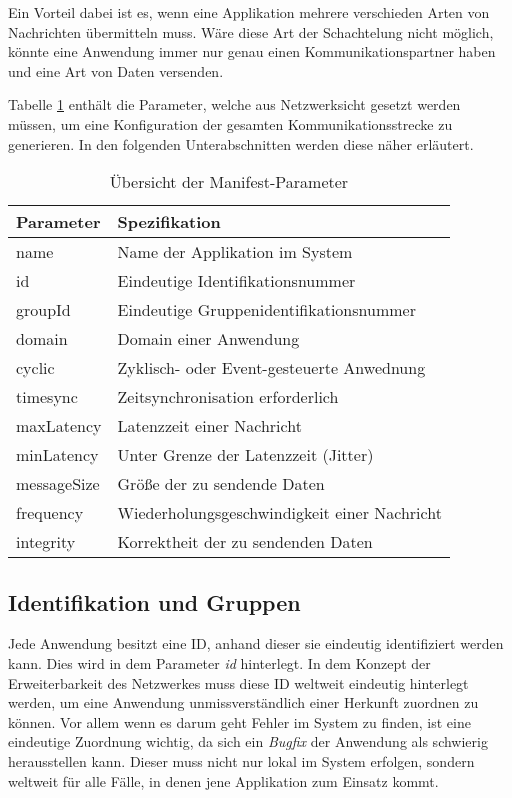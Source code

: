 \newpage

Ein Vorteil dabei ist es, wenn eine Applikation mehrere verschieden Arten von Nachrichten übermitteln muss. Wäre diese Art der Schachtelung nicht möglich, könnte eine Anwendung immer nur genau einen Kommunikationspartner haben und eine Art von Daten versenden. 

Tabelle \ref{tab:Manifest} enthält die Parameter, welche aus Netzwerksicht gesetzt werden müssen, um eine Konfiguration der gesamten Kommunikationsstrecke zu generieren. In den folgenden Unterabschnitten werden diese näher erläutert.
\begin{table}[!htb]
	\centering
	\begin{tabularx}{0.85\textwidth}{p{} | p{} }
		Parameter & Spezifikation \\
		\hline\hline
		name & Name der Applikation im System \\
		id & Eindeutige Identifikationsnummer  \\
		groupId & Eindeutige Gruppenidentifikationsnummer \\
		domain & Domain einer Anwendung \\
		cyclic & Zyklisch- oder Event-gesteuerte Anwednung \\
		timesync & Zeitsynchronisation erforderlich \\
		maxLatency & Latenzzeit einer Nachricht\\
		minLatency & Unter Grenze der Latenzzeit (Jitter)\\
		messageSize & Größe der zu sendende Daten \\
		frequency & Wiederholungsgeschwindigkeit einer Nachricht\\
		integrity & Korrektheit der zu sendenden Daten\\
		\end{tabularx}
	\caption[Übersicht der Manifest-Parameter]{Übersicht der Manifest-Parameter}
	\label{tab:Manifest}
\end{table}

\subsection{Identifikation und Gruppen}
Jede Anwendung besitzt eine \ac{ID}, anhand dieser sie eindeutig identifiziert werden kann. Dies wird in dem Parameter \emph{id} hinterlegt. In dem Konzept der Erweiterbarkeit des Netzwerkes muss diese \ac{ID} weltweit eindeutig hinterlegt werden, um eine Anwendung unmissverständlich einer Herkunft zuordnen zu können. Vor allem wenn es darum geht Fehler im System zu finden, ist eine eindeutige Zuordnung wichtig, da sich ein \emph{Bugfix} der Anwendung als schwierig herausstellen kann. Dieser muss nicht nur lokal im System erfolgen, sondern weltweit für alle Fälle, in denen jene Applikation zum Einsatz kommt. 

